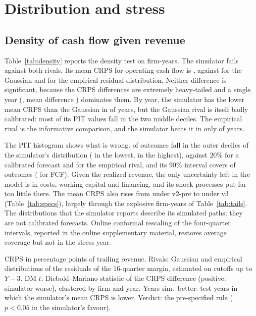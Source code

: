 \documentclass[preprint,12pt,authoryear]{elsarticle}
\begin{document}
\section{Distribution and stress}\label{sec:pillarB}

\subsection{Density of cash flow given revenue}
Table~\ref{tab:density} reports the density test on \DenN{} firm-years. The simulator fails against both rivals. Its mean CRPS for operating cash flow is \DenCrpsTwin, against \DenCrpsGauss{} for the Gaussian and \DenCrpsEmp{} for the empirical residual distribution. Neither difference is significant, because the CRPS differences are extremely heavy-tailed and a single year (\DenWorstYear, mean difference \DenWorstDiff) dominates them. By year, the simulator has the lower mean CRPS than the Gaussian in \DenBetterGauss{} of \DenYears{} years, but the Gaussian rival is itself badly calibrated: most of its PIT values fall in the two middle deciles. The empirical rival is the informative comparison, and the simulator beats it in only \DenBetterEmp{} of \DenYears{} years.

The PIT histogram shows what is wrong. \DenPitTails{} of outcomes fall in the outer deciles of the simulator's distribution (\DenPitLow{} in the lowest, \DenPitHigh{} in the highest), against 20\% for a calibrated forecast and \DenPitEmpTails{} for the empirical rival, and its 90\% interval covers \DenCov{} of outcomes (\DenCovFcf{} for FCF). Given the realized revenue, the only uncertainty left in the model is in costs, working capital and financing, and its shock processes put far too little there. The mean CRPS also rises from \CrpsVtwopre{} under v2-pre to \CrpsVthree{} under v3 (Table~\ref{tab:specs}), largely through the explosive firm-years of Table~\ref{tab:tails}. The distributions that the simulator reports describe its simulated paths; they are not calibrated forecasts. Online conformal rescaling of the four-quarter intervals, reported in the online supplementary material, restores average coverage but not in the stress year.

\begin{table}[t]
\centering\scriptsize
\caption{Density test: predictive distributions of eight-quarter cash flow given realized revenue}
\label{tab:density}

\par\smallskip
\begin{minipage}{\linewidth}\footnotesize
CRPS in percentage points of trailing revenue. Rivals: Gaussian and empirical distributions of the residuals of the 16-quarter margin, estimated on cutoffs up to $Y-3$. DM $t$: Diebold--Mariano statistic of the CRPS difference (positive: simulator worse), clustered by firm and year. Years sim.\ better: test years in which the simulator's mean CRPS is lower. Verdict: the pre-specified rule ($p<0.05$ in the simulator's favour).
\end{minipage}
\end{table}
\end{document}
